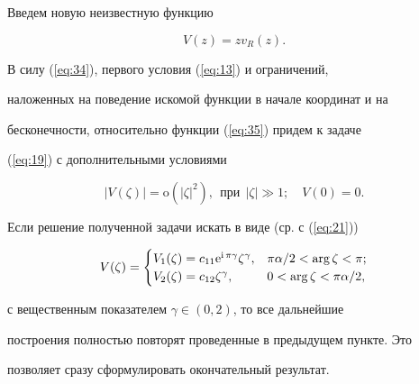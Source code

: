 Введем новую неизвестную функцию


\begin{equation} 


V(z)=zv_R(z). \label{eq:35}


\end{equation}


В силу (\ref{eq:34}), первого условия (\ref{eq:13}) и ограничений,


наложенных на поведение искомой функции в начале координат и на


бесконечности, относительно функции (\ref{eq:35}) придем к задаче


(\ref{eq:19}) с дополнительными условиями


$$


|V(\zeta)|=\mathrm o(|\zeta|^2),\ \ \text{при}\ \ |\zeta|\gg 1;\quad


V(0)=0.


$$


Если решение полученной задачи искать в виде (ср. с (\ref{eq:21}))


$$


V(\zeta)=\begin{cases}


V_1(\zeta)=c_{11}\mathrm e^{\i\pi\gamma}\zeta^\gamma, &


\pi\alpha /2<\arg\zeta<\pi;\\


V_2(\zeta)=c_{12}\zeta^\gamma,


& 0<\arg\zeta<\pi\alpha/2,\end{cases}


$$


с вещественным показателем $\gamma\in (0,2)$, то все дальнейшие


построения полностью повторят проведенные в предыдущем пункте. Это


позволяет сразу сформулировать окончательный результат.





